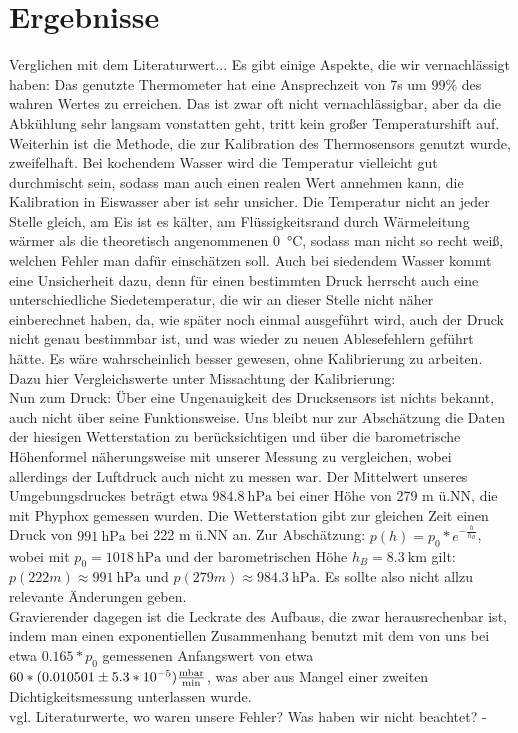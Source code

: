 \documentclass[]{article}
\begin{document}
\section{Ergebnisse}
Verglichen mit dem Literaturwert...
Es gibt einige Aspekte, die wir vernachlässigt haben:
Das genutzte Thermometer hat eine Ansprechzeit von 7s um $99\%$ des wahren Wertes zu erreichen. Das ist zwar oft nicht vernachlässigbar, aber da die Abkühlung sehr langsam vonstatten geht, tritt kein großer Temperaturshift auf.
Weiterhin ist die Methode, die zur Kalibration des Thermosensors genutzt wurde, zweifelhaft. Bei kochendem Wasser wird die Temperatur vielleicht gut durchmischt sein, sodass man auch einen realen Wert annehmen kann, die Kalibration in Eiswasser aber ist sehr unsicher. Die Temperatur nicht an jeder Stelle gleich, am Eis ist es kälter, am Flüssigkeitsrand durch Wärmeleitung wärmer als die theoretisch angenommenen \SI{0}{\celsius}, sodass man nicht so recht weiß, welchen Fehler man dafür einschätzen soll. Auch bei siedendem Wasser kommt eine Unsicherheit dazu, denn für einen bestimmten Druck herrscht auch eine unterschiedliche Siedetemperatur, die wir an dieser Stelle nicht näher einberechnet haben, da, wie später noch einmal ausgeführt wird, auch der Druck nicht genau bestimmbar ist, und was wieder zu neuen Ablesefehlern geführt hätte.
Es wäre wahrscheinlich besser gewesen, ohne Kalibrierung zu arbeiten. {\color{red}Dazu hier Vergleichswerte unter Missachtung der Kalibrierung}:\\
Nun zum Druck: Über eine Ungenauigkeit des Drucksensors ist nichts bekannt, auch nicht über seine Funktionsweise. Uns bleibt nur zur Abschätzung die Daten der hiesigen Wetterstation zu berücksichtigen und über die barometrische Höhenformel näherungsweise mit unserer Messung zu vergleichen, wobei allerdings der Luftdruck auch nicht zu messen war. Der Mittelwert unseres Umgebungsdruckes beträgt etwa $\SI{984.8}{\hecto \pascal}$ bei einer Höhe von 279 m ü.NN, die mit Phyphox gemessen wurden. Die Wetterstation gibt zur gleichen Zeit einen Druck von $\SI{991}{\hecto \pascal}$ bei 222 m ü.NN an. Zur Abschätzung: $p(h)=p_0*e^{-\frac{h}{h_B}}$, wobei mit $p_0=\SI{1018}{\hecto \pascal}$ und der barometrischen Höhe $h_B=\SI{8.3}{\kilo \meter}$ gilt: $p(222m) \approx \SI{991}{\hecto \pascal}$ und $p(279m) \approx \SI{984.3}{\hecto \pascal}$. Es sollte also nicht allzu relevante Änderungen geben.\\
Gravierender dagegen ist die Leckrate des Aufbaus, die zwar herausrechenbar ist, indem man einen exponentiellen Zusammenhang benutzt mit dem von uns bei etwa $0.165*p_0$ gemessenen Anfangswert von etwa $60*(0.010501 \pm 5.3*10^{-5})\SI{}{\frac{\milli \bar } {\minute}}$, was aber aus Mangel einer zweiten Dichtigkeitsmessung unterlassen wurde. \\
vgl. Literaturwerte, wo waren unsere Fehler? Was haben wir nicht beachtet? - 
\end{document}
